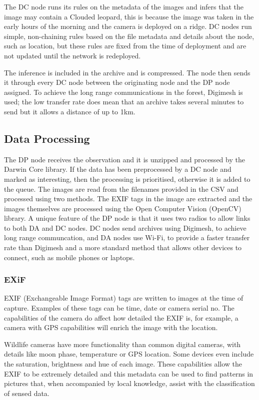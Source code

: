 			The DC node runs its rules on the metadata of the images and infers that the image may contain a Clouded leopard, this is because the image was taken in the early hours of the morning and the camera is deployed on a ridge. DC nodes run simple, non-chaining rules based on the file metadata and details about the node, such as location, but these rules are fixed from the time of deployment and are not updated until the network is redeployed.
			
			The inference is included in the archive and is compressed. The node then sends it through every DC node between the originating node and the DP node assigned. To achieve the long range communications in the forest, Digimesh is used; the low transfer rate does mean that an archive takes several minutes to send but it allows a distance of up to 1km.

	\subsection{Data Processing}			
			The DP node receives the observation and it is unzipped and processed by the Darwin Core library. If the data has been preprocessed by a DC node and marked as interesting, then the processing is prioritised, otherwise it is added to the queue. The images are read from the filenames provided in the CSV and processed using two methods. The EXIF tags in the image are extracted and the images themselves are processed using the Open Computer Vision (OpenCV) library. A unique feature of the DP node is that it uses two radios to allow links to both DA and DC nodes. DC nodes send archives using Digimesh, to achieve long range communcation, and DA nodes use Wi-Fi, to provide a faster transfer rate than Digimesh and a more standard method that allows other devices to connect, such as mobile phones or laptops.
			
		\subsubsection{EXiF}
			EXIF (Exchangeable Image Format) tags are written to images at the time of capture. Examples of these tags can be time, date or camera serial no. The capabilities of the camera do affect how detailed the EXIF is, for example, a camera with GPS capabilities will enrich the image with the location. 
			
			Wildlife cameras have more functionality than common digital cameras, with details like moon phase, temperature or GPS location. Some devices even include the saturation, brightness and hue of each image. These capabilities allow the EXIF to be extremely detailed and this metadata can be used to find patterns in pictures that, when accompanied by local knowledge, assist with the classification of sensed data. 
			
